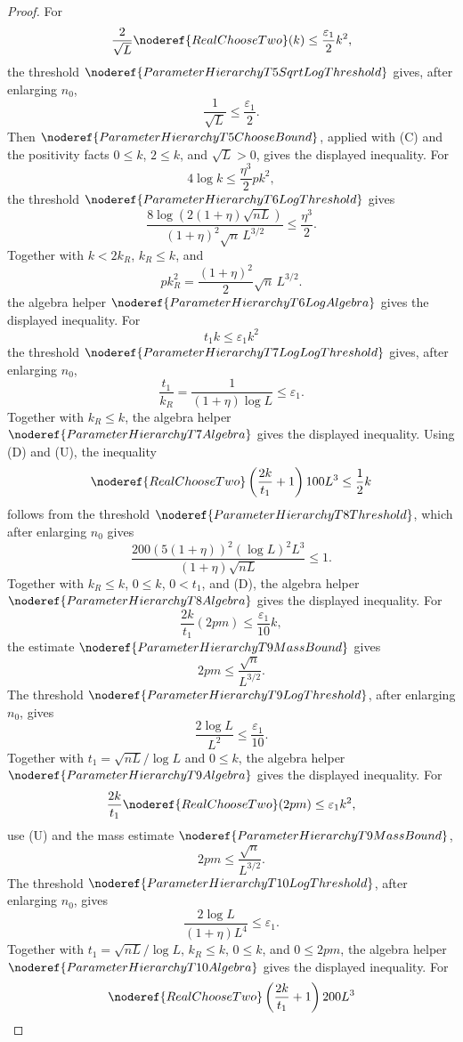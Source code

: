 \begin{proof}
For
\[
\frac2{\sqrt L}\noderef{RealChooseTwo}(k)
\le\frac{\varepsilon_1}{2}k^2,
\]
the threshold \(\noderef{ParameterHierarchyT5SqrtLogThreshold}\) gives,
after enlarging \(n_0\),
\[
\frac1{\sqrt L}\le\frac{\varepsilon_1}{2}. \tag{T5}
\]
Then \(\noderef{ParameterHierarchyT5ChooseBound}\), applied with (C) and
the positivity facts \(0\le k\), \(2\le k\), and \(\sqrt L>0\), gives the
displayed inequality.
For
\[
4\log k\le\frac{\eta^3}{2}pk^2,
\]
the threshold \(\noderef{ParameterHierarchyT6LogThreshold}\) gives
\[
\frac{8\log(2(1+\eta)\sqrt{nL})}
{(1+\eta)^2\sqrt n\,L^{3/2}}
\le\frac{\eta^3}{2}. \tag{T6}
\]
Together with \(k<2k_R\), \(k_R\le k\), and
\[
pk_R^2=\frac{(1+\eta)^2}{2}\sqrt n\,L^{3/2}.
\]
the algebra helper \(\noderef{ParameterHierarchyT6LogAlgebra}\) gives the
displayed inequality.
For
\[
t_1k\le\varepsilon_1 k^2
\]
the threshold \(\noderef{ParameterHierarchyT7LogLogThreshold}\) gives,
after enlarging \(n_0\),
\[
\frac{t_1}{k_R}=\frac1{(1+\eta)\log L}\le\varepsilon_1. \tag{T7}
\]
Together with \(k_R\le k\), the algebra helper
\(\noderef{ParameterHierarchyT7Algebra}\) gives the displayed inequality.
Using (D) and (U), the inequality
\[
\noderef{RealChooseTwo}\left(\frac{2k}{t_1}+1\right)100L^3
\le\frac12k
\]
follows from the threshold \(\noderef{ParameterHierarchyT8Threshold}\),
which after enlarging \(n_0\) gives
\[
\frac{200(5(1+\eta))^2(\log L)^2L^3}
{(1+\eta)\sqrt{nL}}\le1. \tag{T8}
\]
Together with \(k_R\le k\), \(0\le k\), \(0<t_1\), and (D), the algebra
helper \(\noderef{ParameterHierarchyT8Algebra}\) gives the displayed
inequality.
For
\[
\frac{2k}{t_1}(2pm)\le\frac{\varepsilon_1}{10}k,
\]
the estimate \(\noderef{ParameterHierarchyT9MassBound}\) gives
\[
2pm\le\frac{\sqrt n}{L^{3/2}}.
\]
The threshold \(\noderef{ParameterHierarchyT9LogThreshold}\), after
enlarging \(n_0\), gives
\[
\frac{2\log L}{L^2}\le\frac{\varepsilon_1}{10}. \tag{T9}
\]
Together with \(t_1=\sqrt{nL}/\log L\) and \(0\le k\), the algebra helper
\(\noderef{ParameterHierarchyT9Algebra}\) gives the displayed inequality.
For
\[
\frac{2k}{t_1}\noderef{RealChooseTwo}(2pm)\le\varepsilon_1 k^2,
\]
use (U) and the mass estimate
\(\noderef{ParameterHierarchyT9MassBound}\),
\[
2pm\le\frac{\sqrt n}{L^{3/2}}.
\]
The threshold \(\noderef{ParameterHierarchyT10LogThreshold}\), after
enlarging \(n_0\), gives
\[
\frac{2\log L}{(1+\eta)L^4}\le\varepsilon_1. \tag{T10}
\]
Together with \(t_1=\sqrt{nL}/\log L\), \(k_R\le k\), \(0\le k\), and
\(0\le2pm\), the algebra helper
\(\noderef{ParameterHierarchyT10Algebra}\) gives the displayed inequality.
For
\[
\noderef{RealChooseTwo}\left(\frac{2k}{t_1}+1\right)200L^3
\]
\end{proof}
